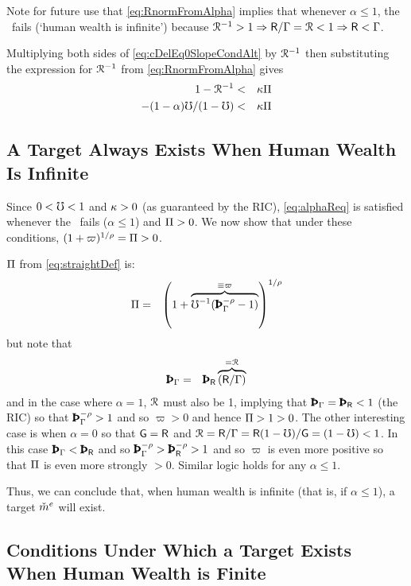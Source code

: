 \documentclass{handout}
\begin{document}
Note for future use that \eqref{eq:RnormFromAlpha} implies that whenever $\alpha \leq 1$, the \FHWCPGro~fails (`human wealth is infinite') because $\mathcal{R}^{-1} > 1 \Rightarrow \mathsf{R}/\Gamma = \mathcal{R} < 1 \Rightarrow \mathsf{R} < \Gamma$.  

Multiplying both sides of \eqref{eq:cDelEq0SlopeCondAlt} by $\mathcal{R}^{-1}$ then substituting the expression for $\mathcal{R}^{-1}$ from \eqref{eq:RnormFromAlpha} gives
\begin{eqnarray}
  1- \mathcal{R}^{-1} & < & \kappa \Pi
\\ - (1-\alpha)\mho/(1-\mho) & < & \kappa \Pi \label{eq:alphaReq}
\end{eqnarray}

\subsection{A Target Always Exists When Human Wealth Is Infinite}

Since $0 < \mho < 1$ and $\kappa>0$ (as guaranteed by the RIC), \eqref{eq:alphaReq} is satisfied whenever the \FHWCPGro~fails ($\alpha \leq 1$) and $\Pi > 0$.
We now show that under these conditions, $(1+\varpi)^{1/\rho}=\Pi>0$.  

$\Pi$ from \eqref{eq:straightDef} is:
\begin{eqnarray}
  \straight & = & \left(1+\overbrace{\urate^{-1}(\PatPGro^{-\CRRA}-1)}^{\equiv \varpi}\right)^{1/\CRRA}
\end{eqnarray}
but note that 
\begin{eqnarray}
  \PatPGro & = & \PatR \overbrace{(\Rfree/\PGro)}^{=\Rnorm}
\end{eqnarray}
and in the case where $\alpha=1$, $\mathcal{R}$ must also be 1, implying that $\PatPGro = \PatR < 1$ (the RIC) so that $\PatPGro^{-\CRRA} > 1$ and so $\varpi > 0$ and hence $\Pi > 1 > 0$.  The other interesting case is when $\alpha=0$ so that $\mathsf{G}=\mathsf{R}$ and $\mathcal{R}=\mathsf{R}/\Gamma=\mathsf{R}(1-\mho)/\mathsf{G}=(1-\mho)<1$.  In this case $\PatPGro < \PatR$ and so $\PatPGro^{-\CRRA} > \PatR^{-\CRRA} > 1$ and so $\varpi$ is even more positive so that $\Pi$ is even more strongly $>0$.  Similar logic holds for any $\alpha \leq 1$.  

Thus, we can conclude that, when human wealth is infinite (that is, if $\alpha \leq 1$), a target $\check{m}^{e}$ will exist.  

\subsection{Conditions Under Which a Target Exists When Human Wealth is Finite}
\end{document}
